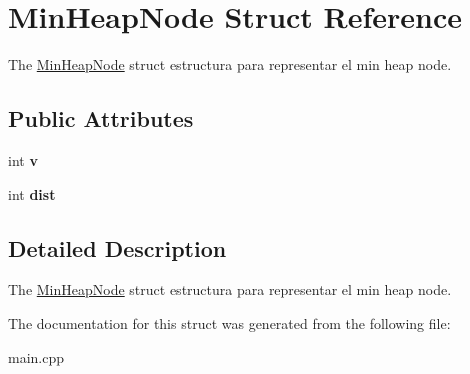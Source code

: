\hypertarget{struct_min_heap_node}{}\section{Min\+Heap\+Node Struct Reference}
\label{struct_min_heap_node}


The \hyperlink{struct_min_heap_node}{Min\+Heap\+Node} struct estructura para representar el min heap node.  


\subsection*{Public Attributes}
\begin{DoxyCompactItemize}
\item 
\mbox{\label{struct_min_heap_node_ae8e924bbd85d4fc80f1f841bc7d46cdd}} 
int {\bfseries v}
\item 
\mbox{\label{struct_min_heap_node_ab6e5caa74582a330e2106ae442bf0c5d}} 
int {\bfseries dist}
\end{DoxyCompactItemize}


\subsection{Detailed Description}
The \hyperlink{struct_min_heap_node}{Min\+Heap\+Node} struct estructura para representar el min heap node. 

The documentation for this struct was generated from the following file\+:\begin{DoxyCompactItemize}
\item 
main.\+cpp\end{DoxyCompactItemize}
